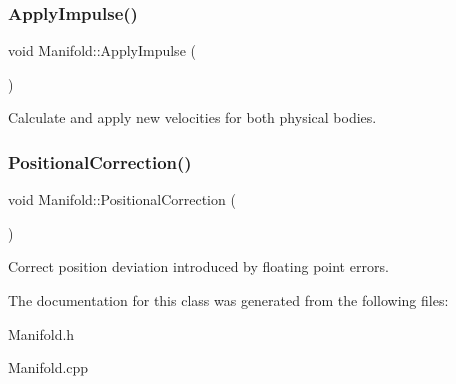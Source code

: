 \subsubsection{\texorpdfstring{Apply\+Impulse()}{ApplyImpulse()}}
{\footnotesize\ttfamily void Manifold\+::\+Apply\+Impulse (\begin{DoxyParamCaption}{ }\end{DoxyParamCaption})}



Calculate and apply new velocities for both physical bodies. 

\mbox{\label{class_manifold_a9d3187192136eac849265f7d386f617e}} 
\subsubsection{\texorpdfstring{Positional\+Correction()}{PositionalCorrection()}}
{\footnotesize\ttfamily void Manifold\+::\+Positional\+Correction (\begin{DoxyParamCaption}{ }\end{DoxyParamCaption})}



Correct position deviation introduced by floating point errors. 



The documentation for this class was generated from the following files\+:\begin{DoxyCompactItemize}
\item 
Manifold.\+h\item 
Manifold.\+cpp\end{DoxyCompactItemize}
